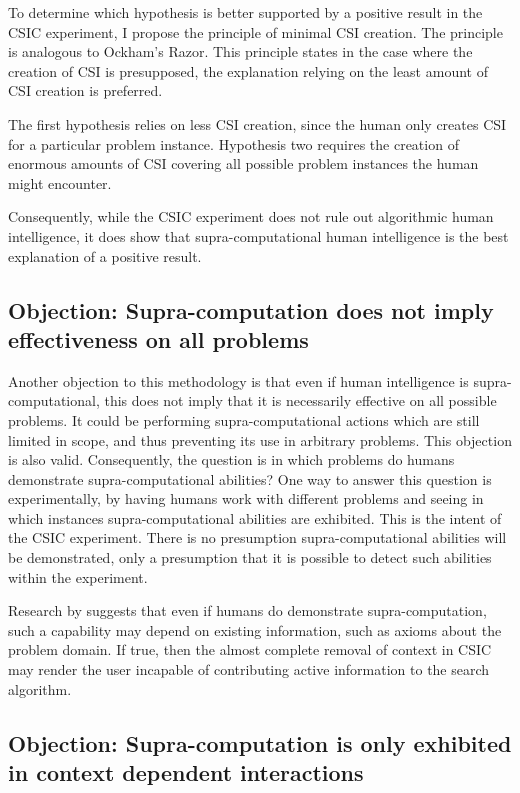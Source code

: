 To determine which hypothesis is better supported by a positive result in the CSIC experiment, I propose the principle of minimal CSI creation.  The principle is analogous to Ockham's Razor.  This principle states in the case where the creation of CSI is presupposed, the explanation relying on the least amount of CSI creation is preferred.

The first hypothesis relies on less CSI creation, since the human only creates CSI for a particular problem instance.  Hypothesis two requires the creation of enormous amounts of CSI covering all possible problem instances the human might encounter.

 Consequently, while the CSIC experiment does not rule out algorithmic human intelligence, it does show that supra-computational human intelligence is the best explanation of a positive result. 

\subsection{Objection: Supra-computation does not imply effectiveness on all problems}
Another objection to this methodology is that even if human intelligence is supra-computational, this does not imply that it is necessarily effective on all possible problems.  It could be performing supra-computational actions which are still limited in scope, and thus preventing its use in arbitrary problems. This objection is also valid.  Consequently, the question is in which problems do humans demonstrate supra-computational abilities?  One way to answer this question is experimentally, by having humans work with different problems and seeing in which instances supra-computational abilities are exhibited.  This is the intent of the CSIC experiment.  There is no presumption supra-computational abilities will be demonstrated, only a presumption that it is possible to detect such abilities within the experiment. 

Research by \citet{bartlett11:_using_turin_oracl_in_cognit_model} suggests that even if humans do demonstrate supra-computation, such a capability may depend on existing information, such as axioms about the problem domain.  If true, then the almost complete removal of context in CSIC may render the user incapable of contributing active information to the search algorithm.

\subsection{Objection: Supra-computation is only exhibited in context dependent interactions}

